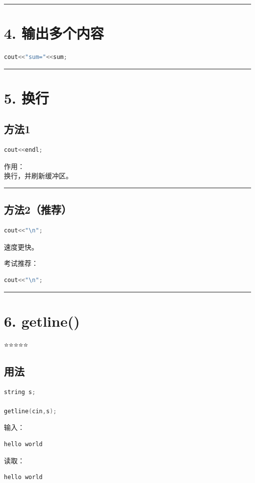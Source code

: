 \documentclass[9pt,twocolumn]{extarticle}
\begin{document}
\noindent\rule{\linewidth}{0.4pt}

\section{4. 输出多个内容}
\begin{lstlisting}[language=C++]
cout<<"sum="<<sum;
\end{lstlisting}

\noindent\rule{\linewidth}{0.4pt}

\section{5. 换行}

\subsection{方法1}
\begin{lstlisting}[language=C++]
cout<<endl;
\end{lstlisting}
作用：\\
换行，并刷新缓冲区。

\noindent\rule{\linewidth}{0.4pt}

\subsection{方法2（推荐）}
\begin{lstlisting}[language=C++]
cout<<"\n";
\end{lstlisting}
速度更快。

考试推荐：
\begin{lstlisting}[language=C++]
cout<<"\n";
\end{lstlisting}

\noindent\rule{\linewidth}{0.4pt}

\section{6. getline()}

⭐⭐⭐⭐⭐

\subsection{用法}
\begin{lstlisting}[language=C++]
string s;

getline(cin,s);
\end{lstlisting}
输入：
\begin{lstlisting}
hello world
\end{lstlisting}
读取：
\begin{lstlisting}
hello world
\end{lstlisting}
\end{document}
